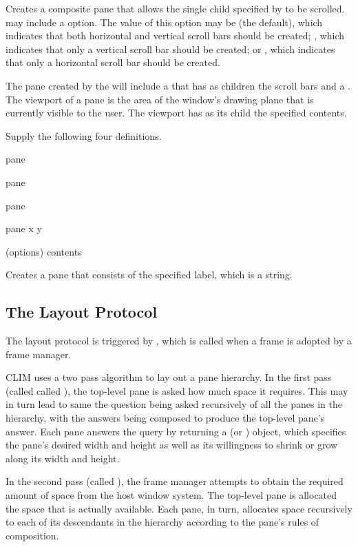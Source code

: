 Creates a composite pane that allows the single child specified by
 to be scrolled.   may include a 
option.  The value of this option may be  (the default), which indicates
that both horizontal and vertical scroll bars should be created; ,
which indicates that only a vertical scroll bar should be created; or
, which indicates that only a horizontal scroll bar should be
created.

The pane created by the  will include a  that
has as children the scroll bars and a .  The viewport of a
pane is the area of the window's drawing plane that is currently visible to the
user.  The viewport has as its child the specified contents.

 {Supply the following four definitions.}

 {pane}

 {pane}

 {pane}

 {pane x y}


 {(\rest options) \body contents}

Creates a pane that consists of the specified label, which is a string.


\subsection {The Layout Protocol\label{layout-protocol}}

The layout protocol is triggered by , which is called when a
frame is adopted by a frame manager.

CLIM uses a two pass algorithm to lay out a pane hierarchy.  In the first pass
(called called ), the top-level pane is asked how
much space it requires.  This may in turn lead to same the question being asked
recursively of all the panes in the hierarchy, with the answers being composed
to produce the top-level pane's answer.  Each pane answers the query by
returning a  (or ) object,
which specifies the pane's desired width and height as well as its willingness
to shrink or grow along its width and height.

In the second pass (called ), the frame manager
attempts to obtain the required amount of space from the host window system.
The top-level pane is allocated the space that is actually available.  Each
pane, in turn, allocates space recursively to each of its descendants in the
hierarchy according to the pane's rules of composition.

